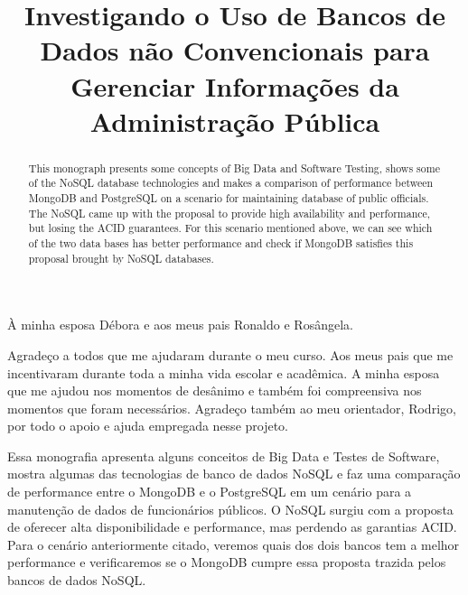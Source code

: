 \documentclass[licenciatura]{unb-cic}
\title{Investigando o {U}so de {B}ancos de {D}ados não {C}onvencionais para 
{G}erenciar {I}nformações da {A}dministração {P}ública}
\begin{document}
  \maketitle
  \pretextual

  \begin{dedicatoria}
À minha esposa Débora e aos meus pais Ronaldo e Rosângela.
  \end{dedicatoria}

  \begin{agradecimentos}
  Agradeço a todos que me ajudaram durante o meu curso. Aos meus pais que me incentivaram durante toda a minha vida escolar e acadêmica. A minha esposa que me ajudou nos momentos de desânimo e também foi compreensiva nos momentos que foram necessários.
Agradeço também ao meu orientador, Rodrigo, por todo o apoio e ajuda empregada nesse projeto.
  \end{agradecimentos}

  \begin{resumo}
Essa monografia apresenta alguns conceitos de Big Data e Testes de Software, mostra algumas das tecnologias de banco de dados NoSQL e  faz uma comparação de performance entre o MongoDB e o PostgreSQL em um cenário para a manutenção de dados de funcionários públicos. O NoSQL surgiu com a proposta de oferecer alta disponibilidade e performance, mas perdendo as garantias ACID. Para o cenário anteriormente citado, veremos quais dos dois bancos tem a melhor performance e verificaremos se o MongoDB cumpre essa proposta trazida pelos bancos de dados NoSQL.
  \end{resumo}

{
  \begin{abstract}
This monograph presents some concepts of Big Data and Software Testing, shows some of the NoSQL database technologies and makes a comparison of performance between MongoDB and PostgreSQL on a scenario for maintaining database of public officials. The NoSQL came up with the proposal to provide high availability and performance, but losing the ACID guarantees. For this scenario mentioned above, we can see which of the two data bases has better performance and check if MongoDB satisfies this proposal brought by NoSQL databases.
  \end{abstract}
}

  \tableofcontents
  \listoffigures
  \listoftables

  \textual
  

  
  
  

  \postextual
  
  
\end{document}
